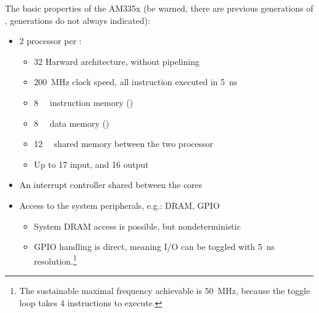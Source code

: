 The basic properties of the AM335x \pruss{} (be warned, there are previous generations of \pruss, generations do not always indicated):
\begin{itemize}
	\item 2 \pru{} processor per \pruss{}:
	\begin{itemize}
		\item \SI{32}{\bit} Harward architecture, without pipelining
		\item \SI{200}{\mega\hertz} clock speed, all instruction executed in \SI{5}{\nano\second}
		\item \SI{8}{\kilo\byte} instruction memory (\iram)
		\item \SI{8}{\kilo\byte} data memory (\dram)
		\item \SI{12}{\kilo\byte} shared memory between the two processor
		\item Up to 17 input, and 16 output
	\end{itemize}
	\item An interrupt controller shared between the \pru{} cores
	\item Access to the system peripherals, e.g.: DRAM, GPIO
	\begin{itemize}
		\item System DRAM access is possible, but nondeterministic
		\item GPIO handling is direct, meaning I/O can be toggled with \SI{5}{\nano\second} resolution.\footnote{The sustainable maximal frequency achievable is \SI{50}{\mega\hertz}, because the toggle loop takes 4 instructions to execute.}
	\end{itemize}
\end{itemize}

